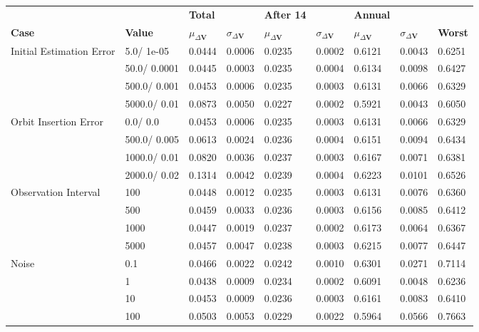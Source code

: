 \begin{table}[H]
\centering
\begin{tabular}{lllllllll}
 &  & \cellcolor[HTML]{EFEFEF}\textbf{Total} &  & \cellcolor[HTML]{EFEFEF}\textbf{After 14} & & \cellcolor[HTML]{EFEFEF}\textbf{Annual} & &\\
\rowcolor[HTML]{EFEFEF} 
\textbf{Case} & \textbf{Value} & \textbf{$\mu_{\Delta \boldsymbol{V}}$} & \textbf{$\sigma_{\Delta \boldsymbol{V}}$} & \textbf{$\mu_{\Delta \boldsymbol{V}}$} & \textbf{$\sigma_{\Delta \boldsymbol{V}}$} & \textbf{$\mu_{\Delta \boldsymbol{V}}$} & \textbf{$\sigma_{\Delta \boldsymbol{V}}$} & \textbf{Worst} \\ 
Initial Estimation Error & 5.0/
1e-05 & 0.0444 & 0.0006 & 0.0235 & 0.0002 & 0.6121 & 0.0043 & 0.6251 \\ 
 & 50.0/
0.0001 & 0.0445 & 0.0003 & 0.0235 & 0.0004 & 0.6134 & 0.0098 & 0.6427 \\ 
 & 500.0/
0.001 & 0.0453 & 0.0006 & 0.0235 & 0.0003 & 0.6131 & 0.0066 & 0.6329 \\ 
 & 5000.0/
0.01 & 0.0873 & 0.0050 & 0.0227 & 0.0002 & 0.5921 & 0.0043 & 0.6050 \\ 
Orbit Insertion Error & 0.0/
0.0 & 0.0453 & 0.0006 & 0.0235 & 0.0003 & 0.6131 & 0.0066 & 0.6329 \\ 
 & 500.0/
0.005 & 0.0613 & 0.0024 & 0.0236 & 0.0004 & 0.6151 & 0.0094 & 0.6434 \\ 
 & 1000.0/
0.01 & 0.0820 & 0.0036 & 0.0237 & 0.0003 & 0.6167 & 0.0071 & 0.6381 \\ 
 & 2000.0/
0.02 & 0.1314 & 0.0042 & 0.0239 & 0.0004 & 0.6223 & 0.0101 & 0.6526 \\ 
Observation Interval & 100 & 0.0448 & 0.0012 & 0.0235 & 0.0003 & 0.6131 & 0.0076 & 0.6360 \\ 
 & 500 & 0.0459 & 0.0033 & 0.0236 & 0.0003 & 0.6156 & 0.0085 & 0.6412 \\ 
 & 1000 & 0.0447 & 0.0019 & 0.0237 & 0.0002 & 0.6173 & 0.0064 & 0.6367 \\ 
 & 5000 & 0.0457 & 0.0047 & 0.0238 & 0.0003 & 0.6215 & 0.0077 & 0.6447 \\ 
Noise & 0.1 & 0.0466 & 0.0022 & 0.0242 & 0.0010 & 0.6301 & 0.0271 & 0.7114 \\ 
 & 1 & 0.0438 & 0.0009 & 0.0234 & 0.0002 & 0.6091 & 0.0048 & 0.6236 \\ 
 & 10 & 0.0453 & 0.0009 & 0.0236 & 0.0003 & 0.6161 & 0.0083 & 0.6410 \\ 
 & 100 & 0.0503 & 0.0053 & 0.0229 & 0.0022 & 0.5964 & 0.0566 & 0.7663 \\ 

\end{tabular}
\end{table}
